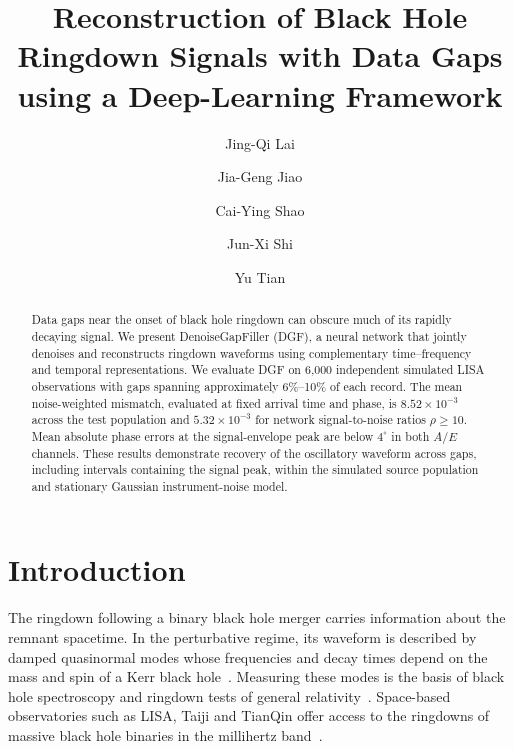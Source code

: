 \documentclass[10pt,prd,aps,a4paper,twocolumn,superscriptaddress,nofootinbib,floatfix]{revtex4-2}
\begin{document}
\title{Reconstruction of Black Hole Ringdown Signals with Data Gaps using a Deep-Learning Framework}
\author{Jing-Qi Lai}
\author{Jia-Geng Jiao}
\author{Cai-Ying Shao}

\author{Jun-Xi Shi}
\author{Yu Tian}

\begin{abstract}
Data gaps near the onset of black hole ringdown can obscure much of its rapidly decaying signal. We present DenoiseGapFiller (DGF), a neural network that jointly denoises and reconstructs ringdown waveforms using complementary time--frequency and temporal representations. We evaluate DGF on 6,000 independent simulated LISA observations with gaps spanning approximately 6\%--10\% of each record. The mean noise-weighted mismatch, evaluated at fixed arrival time and phase, is $8.52\times10^{-3}$ across the test population and $5.32\times10^{-3}$ for network signal-to-noise ratios $\rho\ge10$. Mean absolute phase errors at the signal-envelope peak are below $4^\circ$ in both $A/E$ channels. These results demonstrate recovery of the oscillatory waveform across gaps, including intervals containing the signal peak, within the simulated source population and stationary Gaussian instrument-noise model.
\end{abstract}

\maketitle
\section{Introduction}
The ringdown following a binary black hole merger carries information about the remnant spacetime. In the perturbative regime, its waveform is described by damped quasinormal modes whose frequencies and decay times depend on the mass and spin of a Kerr black hole~\cite{berti2006gravitational,berti2009qnm}. Measuring these modes is the basis of black hole spectroscopy and ringdown tests of general relativity~\cite{Isi_2019}. Space-based observatories such as LISA, Taiji and TianQin offer access to the ringdowns of massive black hole binaries in the millihertz band~\cite{amaroseoane2017laserinterferometerspaceantenna,robson2019construction,Ruan2020,Luo2016}.
\end{document}
